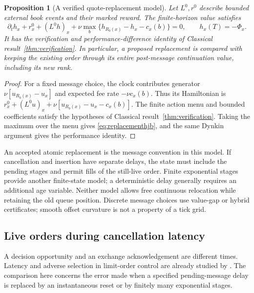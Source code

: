 \documentclass[11pt]{article}
\theoremstyle{plain}
\newtheorem{proposition}[theorem]{Proposition}
\theoremstyle{definition}
\theoremstyle{remark}
\begin{document}
\begin{proposition}[A verified quote-replacement model]
\label{prop:replacementclock}
Let \(L^0,r^0\) describe bounded external book events and their
marked reward. The finite-horizon value satisfies
\begin{equation}\label{eq:replacementhjb}
\partial_t h_x+r_x^0+(L^0h)_x
 +\nu\max_b\{h_{R_b(x)}-h_x-c_x(b)\}=0,
\qquad h_x(T)=-\Phi_x.
\end{equation}
It has the verification and performance-difference identity of
Classical result~\ref{thm:verification}. In particular, a proposed replacement
is compared with keeping the existing order through its entire
post-message continuation value, including its new rank.
\end{proposition}
\begin{proof}
For a fixed message choice, the clock contributes generator
\(\nu[u_{R_b(x)}-u_x]\) and expected fee rate \(-\nu c_x(b)\).
Thus its Hamiltonian is
\(r_x^0+(L^0u)_x+\nu[u_{R_b(x)}-u_x-c_x(b)]\).
The finite action menu and bounded coefficients satisfy the hypotheses
of Classical result~\ref{thm:verification}. Taking the maximum over the menu
gives \eqref{eq:replacementhjb}, and the same Dynkin argument gives
the performance identity.
\end{proof}

An accepted atomic replacement is the message convention in this
model. If cancellation and insertion have separate delays, the state
must include the pending stages and permit fills of the still-live
order. Finite exponential stages provide another finite-state model;
a deterministic delay generally requires an additional age variable.
Neither model allows free continuous relocation while retaining the
old queue position. Discrete message choices use value-gap or hybrid
certificates; smooth offset curvature is not a property of a tick grid.

\subsection{Live orders during cancellation latency}
\label{sec:cancellatency}

A decision opportunity and an exchange acknowledgement are different
times. Latency and adverse selection in limit-order control are
already studied by \citet{LehalleMounjid2017}. The comparison here
concerns the error made when a specified pending-message delay is
replaced by an instantaneous reset or by finitely many exponential
stages.
\end{document}

